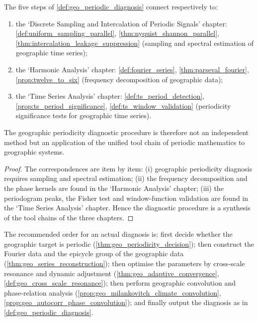 \begin{theorem}\label{thm:geo_diagnosis_integration}
The five steps of \cref{def:geo_periodic_diagnosis} connect respectively to:
\begin{enumerate}[label=(\roman*)]
    \item the `Discrete Sampling and Intercalation of Periodic Signals' chapter: \cref{def:uniform_sampling_parallel}, \cref{thm:nyquist_shannon_parallel}, \cref{thm:intercalation_leakage_suppression} (sampling and spectral estimation of geographic time series);
    \item the `Harmonic Analysis' chapter: \cref{def:fourier_series}, \cref{thm:parseval_fourier}, \cref{prop:twelve_to_six} (frequency decomposition of geographic data);
    \item the `Time Series Analysis' chapter: \cref{def:ts_period_detection}, \cref{prop:ts_period_significance}, \cref{def:ts_window_validation} (periodicity significance tests for geographic time series).
\end{enumerate}
The geographic periodicity diagnostic procedure is therefore not an independent method but an application of the unified tool chain of periodic mathematics to geographic systems.
\end{theorem}

\begin{proof}
The correspondences are item by item:
(i) geographic periodicity diagnosis requires sampling and spectral estimation;
(ii) the frequency decomposition and the phase kernels are found in the `Harmonic Analysis' chapter;
(iii) the periodogram peaks, the Fisher test and window-function validation are found in the `Time Series Analysis' chapter.
Hence the diagnostic procedure is a synthesis of the tool chains of the three chapters.
\end{proof}

\begin{remark}\label{rem:geo_integration_order}
The recommended order for an actual diagnosis is: first decide whether the geographic target is periodic (\cref{thm:geo_periodicity_decision}); then construct the Fourier data and the epicycle group of the geographic data (\cref{thm:geo_series_reconstruction}); then optimise the parameters by cross-scale resonance and dynamic adjustment (\cref{thm:geo_adaptive_convergence}, \cref{def:geo_cross_scale_resonance}); then perform geographic convolution and phase-relation analysis (\cref{prop:geo_milankovitch_climate_convolution}, \cref{prop:geo_autocorr_phase_convolution}); and finally output the diagnosis as in \cref{def:geo_periodic_diagnosis}.
\end{remark}

